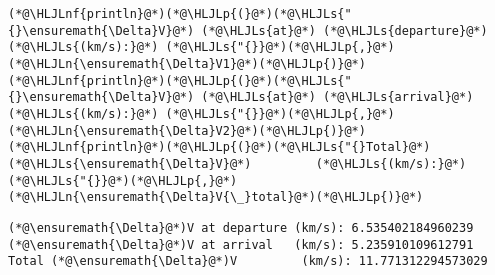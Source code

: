 \documentclass[12pt,a4paper]{article}
\newcommand{\HLJLn}[1]{#1}
\newcommand{\HLJLnf}[1]{\textcolor[RGB]{66,102,213}{#1}}
\newcommand{\HLJLs}[1]{\textcolor[RGB]{201,61,57}{#1}}
\newcommand{\HLJLp}[1]{#1}
\begin{document}
\begin{lstlisting}
(*@\HLJLnf{println}@*)(*@\HLJLp{(}@*)(*@\HLJLs{"{}\ensuremath{\Delta}V}@*) (*@\HLJLs{at}@*) (*@\HLJLs{departure}@*) (*@\HLJLs{(km/s):}@*) (*@\HLJLs{"{}}@*)(*@\HLJLp{,}@*) (*@\HLJLn{\ensuremath{\Delta}V1}@*)(*@\HLJLp{)}@*)
(*@\HLJLnf{println}@*)(*@\HLJLp{(}@*)(*@\HLJLs{"{}\ensuremath{\Delta}V}@*) (*@\HLJLs{at}@*) (*@\HLJLs{arrival}@*)   (*@\HLJLs{(km/s):}@*) (*@\HLJLs{"{}}@*)(*@\HLJLp{,}@*) (*@\HLJLn{\ensuremath{\Delta}V2}@*)(*@\HLJLp{)}@*)
(*@\HLJLnf{println}@*)(*@\HLJLp{(}@*)(*@\HLJLs{"{}Total}@*) (*@\HLJLs{\ensuremath{\Delta}V}@*)         (*@\HLJLs{(km/s):}@*) (*@\HLJLs{"{}}@*)(*@\HLJLp{,}@*) (*@\HLJLn{\ensuremath{\Delta}V{\_}total}@*)(*@\HLJLp{)}@*)
\end{lstlisting}

\begin{lstlisting}
(*@\ensuremath{\Delta}@*)V at departure (km/s): 6.535402184960239
(*@\ensuremath{\Delta}@*)V at arrival   (km/s): 5.235910109612791
Total (*@\ensuremath{\Delta}@*)V         (km/s): 11.771312294573029
\end{lstlisting}
\end{document}

